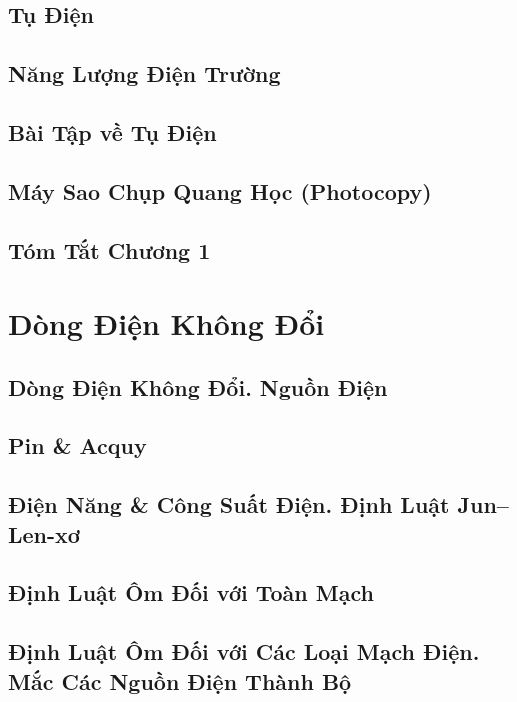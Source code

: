 \documentclass[oneside]{book}
\numberwithin{equation}{section}
\begin{document}
\section{Tụ Điện}

\section{Năng Lượng Điện Trường}

\section{Bài Tập về Tụ Điện}

\section{Máy Sao Chụp Quang Học (Photocopy)}

\section{Tóm Tắt Chương 1}


\chapter{Dòng Điện Không Đổi}

\section{Dòng Điện Không Đổi. Nguồn Điện}

\section{Pin \& Acquy}

\section{Điện Năng \& Công Suất Điện. Định Luật Jun--Len-xơ}

\section{Định Luật Ôm Đối với Toàn Mạch}

\section{Định Luật Ôm Đối với Các Loại Mạch Điện. Mắc Các Nguồn Điện Thành Bộ}
\end{document}
